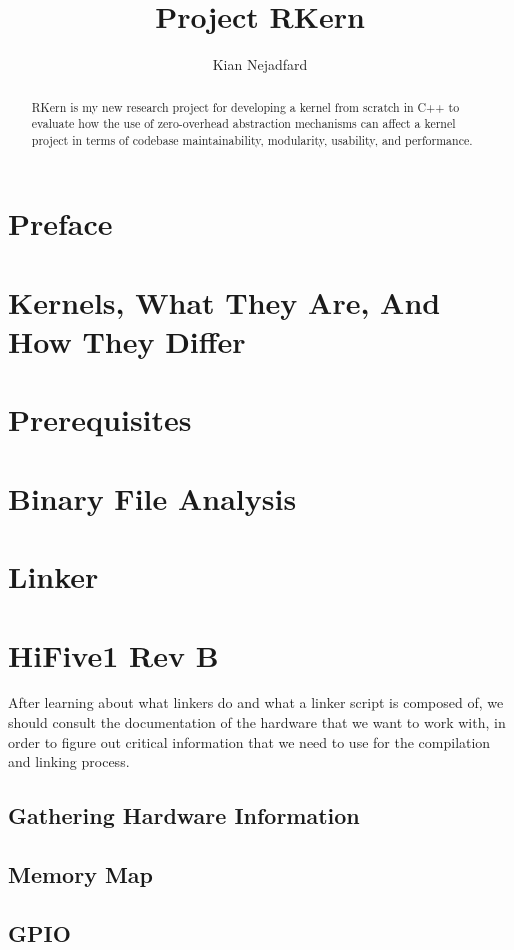 \documentclass[a4paper,12pt,twoside]{report}
\title{Project RKern}
\author{Kian Nejadfard}
\begin{document}
    \maketitle

    \begin{abstract}
    	RKern is my new research project for developing a kernel from scratch in C++ to evaluate how the use of zero-overhead abstraction mechanisms can affect a kernel project in terms of codebase maintainability, modularity, usability, and performance.
    \end{abstract}

	\chapter{Preface}
        

    \chapter{Kernels, What They Are, And How They Differ}
        

    \chapter{Prerequisites}
        

    \chapter{Binary File Analysis}
        

    \chapter{Linker}
        

    \chapter{HiFive1 Rev B}
        After learning about what linkers do and what a linker script is composed of, we should consult the documentation of the hardware that we want to work with, in order to figure out critical information that we need to use for the compilation and linking process.

        \section{Gathering Hardware Information}
            

        \section{Memory Map}
           	

        \section{GPIO}
            

    \printbibliography
\end{document}
